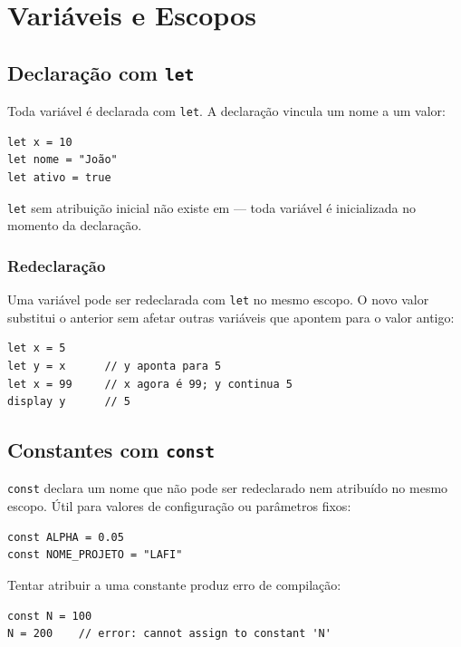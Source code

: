 \chapter{Variáveis e Escopos}

\section{Declaração com \texttt{let}}

Toda variável é declarada com \lstinline{let}. A declaração vincula um nome a um valor:

\begin{lstlisting}
let x = 10
let nome = "João"
let ativo = true
\end{lstlisting}

\lstinline{let} sem atribuição inicial não existe em \hayashi{} — toda variável é
inicializada no momento da declaração.

\subsection*{Redeclaração}

Uma variável pode ser redeclarada com \lstinline{let} no mesmo escopo. O novo valor
substitui o anterior sem afetar outras variáveis que apontem para o valor antigo:

\begin{lstlisting}
let x = 5
let y = x      // y aponta para 5
let x = 99     // x agora é 99; y continua 5
display y      // 5
\end{lstlisting}

\section{Constantes com \texttt{const}}

\lstinline{const} declara um nome que não pode ser redeclarado nem atribuído no
mesmo escopo. Útil para valores de configuração ou parâmetros fixos:

\begin{lstlisting}
const ALPHA = 0.05
const NOME_PROJETO = "LAFI"
\end{lstlisting}

Tentar atribuir a uma constante produz erro de compilação:

\begin{lstlisting}
const N = 100
N = 200    // error: cannot assign to constant 'N'
\end{lstlisting}

